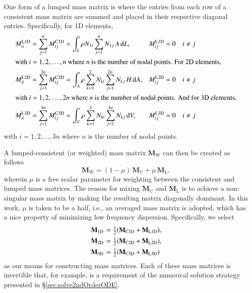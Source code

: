 One form of a lumped mass matrix is where the entries from each row of a consistent mass matrix are summed and placed in their respective diagonal entries\cite{Reddy93}.  Specifically, for 1D elements,
\begin{subequations}
    \label{lumpedMassMatrix}
    \begin{align}
    M^{\mathrm{L1D}}_{ii} & = \sum_{j=1}^n M^{\mathrm{C1D}}_{ij} = \int_L \rho N_{1i} \sum_{j=1}^n N_{1j} \, A \, \mathrm{d}L , & 
    M^{\mathrm{L1D}}_{ij} & = 0 \quad i \neq j  
    \label{lumpedMassMatrix1D} \\
    \intertext{with $i = 1, 2, \ldots , n$ where $n$ is the number of nodal points. For 2D elements,}
    M^{\mathrm{L2D}}_{ii} & = \sum_{j=1}^{2n} M^{\mathrm{C2D}}_{ij} = \int_A \rho \sum_{k=1}^2 N_{ki} \sum_{j=1}^{2n} N_{kj} \, H \, \mathrm{d} A , & 
    M^{\mathrm{L2D}}_{ij} & = 0 \quad i \neq j  
    \label{lumpedMassMatrix2D} \\
    \intertext{with $i = 1 , 2, \ldots , 2n$ where $n$ is the number of nodal points. And for 3D elements,}
    M^{\mathrm{L3D}}_{ii} & = \sum_{j=1}^{3n} M^{\mathrm{C3D}}_{ij} = \int_V \rho \sum_{k=1}^3 N_{ki} \sum_{j=1}^{3n} N_{kj} \, \mathrm{d} V , & 
    M^{\mathrm{L3D}}_{ij} & = 0 \quad i \neq j  
    \label{lumpedMassMatrix3D}
    \end{align}
\end{subequations}
with $i = 1, 2, \ldots , 3n$ where $n$ is the number of nodal points. 

A lumped-consistent (or weighted) mass matrix $\mathbf{M}_{\mathrm{W}}$ can then be created as follows
\begin{equation*}
\mathbf{M}_\mathrm{W}  = (1 - \mu) \, \mathbf{M}_{\mathrm{C}} + \mu \, \mathbf{M}_{\mathrm{L}},
\end{equation*}
wherein $\mu$ is a free scalar parameter for weighting between the consistent and lumped mass matrices.  The reason for mixing $\mathbf{M}_{\mathrm{C}}$ and $\mathbf{M}_{\mathrm{L}}$ is to achieve a non-singular mass matrix by making the resulting matrix diagonally dominant.  In this work, $\mu$ is taken to be a half, i.e., an averaged mass matrix is adopted, which has a nice property of minimizing low frequency dispersion.  Specifically, we select
\begin{subequations}
    \label{LumconsMass}
    \begin{align}
    \mathbf{M}_{\mathrm{1D}} & \defeq \tfrac{1}{2} (\mathbf{M}_{\mathrm{C1D}} + \mathbf{M}_{\mathrm{L1D}}), \\
    \mathbf{M}_{\mathrm{2D}} & \defeq \tfrac{1}{2} (\mathbf{M}_{\mathrm{C2D}} + \mathbf{M}_{\mathrm{L2D}}), \\
    \mathbf{M}_{\mathrm{3D}} & \defeq \tfrac{1}{2} (\mathbf{M}_{\mathrm{C3D}} + \mathbf{M}_{\mathrm{L3D}})
    \end{align}
\end{subequations}
as our means for constructing mass matrices.  Each of these mass matrices is invertible that, for example, is a requirement of the numerical solution strategy presented in \S\ref{sec:solve2ndOrderODE}.

